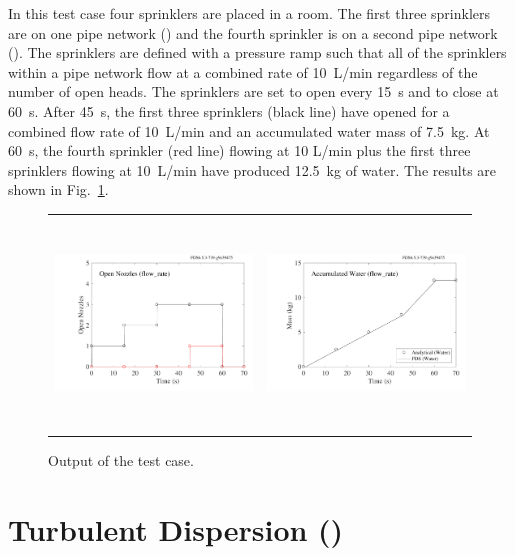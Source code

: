 \documentclass[11pt]{book}
\begin{document}
In this test case four sprinklers are placed in a room.  The first three sprinklers are on one pipe network () and the fourth sprinkler is on a second pipe network ().  The sprinklers are defined with a pressure ramp such that all of the sprinklers within a pipe network flow at a combined rate of 10~L/min regardless of the number of open heads.  The sprinklers are set to open every 15~s and to close at 60~s.  After 45~s, the first three sprinklers (black line) have opened for a combined flow rate of 10~L/min and an accumulated water mass of 7.5~kg.  At 60~s, the fourth sprinkler (red line) flowing at 10 L/min plus the first three sprinklers flowing at 10~L/min have produced 12.5~kg of water. The results are shown in Fig.~\ref{flow_rate_2_figure}.

\begin{figure}[ht]
\begin{tabular*}{\textwidth}{lr}
\includegraphics[height=2.2in]{SCRIPT_FIGURES/flow_rate_2_open_nozzles} &
\includegraphics[height=2.2in]{SCRIPT_FIGURES/flow_rate_2_water_mass}
\end{tabular*}
\caption[The  case]{Output of the  test case.}
\label{flow_rate_2_figure}
\end{figure}



\section{Turbulent Dispersion (\texorpdfstring{{}}{random\_walk}) }
\label{turbulent_dispersion}
\label{random_walk}
\end{document}
